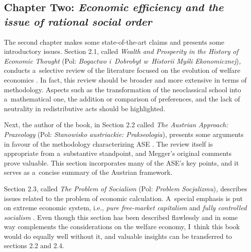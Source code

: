 \subsection{Chapter Two: \textit{Economic efficiency and the issue of rational social order}}



The second chapter makes some state-of-the-art claims and presents some introductory issues. Section 2.1, called \textit{Wealth and Prosperity in the History of Economic Thought} (Pol: \textit{Bogactwo i~Dobrobyt w~Historii Myśli Ekonomicznej})\textit{,} conducts a~selective review of the literature focused on the evolution of welfare economics 
\parencite[][pp.25–34]{megger_sprawiedliwosc_2021}. %
 In fact, this review should be broader and more extensive in terms of methodology. Aspects such as the transformation of the neoclassical school into a~mathematical one, the addition or comparison of preferences, and the lack of neutrality in redistributive acts should be highlighted.



Next, the author of the book, in Section 2.2 called \textit{The Austrian Approach: Praxeology} (Pol: \textit{Stanowisko austriackie: Prakseologia}), presents some arguments in favour of the methodology characterizing ASE 
\parencite[][pp.34–43]{megger_sprawiedliwosc_2021}. %
 The review itself is appropriate from a~substantive standpoint, and Megger's original comments prove valuable. This section incorporates many of the ASE's key points, and it serves as a~concise summary of the Austrian framework.



Section 2.3, called \textit{The Problem of Socialism} (Pol: \textit{Problem Socjalizmu})\textit{,} describes issues related to the problem of economic calculation. A~special emphasis is put on extreme economic system, i.e., \textit{pure free-market capitalism} and \textit{fully controlled socialism} 
\parencite[][pp.43–49]{megger_sprawiedliwosc_2021}. %
 Even though this section has been described flawlessly and in some way complements the considerations on the welfare economy, I~think this book would do equally well without it, and valuable insights can be transferred to sections 2.2 and 2.4.



